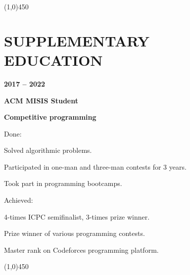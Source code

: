\documentclass[a4paper,12pt,preview]{report}
\newcommand{\hr}{\begin{center} \line(1,0){450} \end{center}}
\begin{document}
\hr


\section*{SUPPLEMENTARY EDUCATION}

\begin{minipage}[c]{0.25\linewidth}
    \textbf{2017 – 2022} 
\end{minipage}
\begin{minipage}[c]{0.65\linewidth}
    \textbf{ACM MISIS Student}
    
    \textbf{Competitive programming}
\end{minipage}

\vspace{5mm} %

\begin{minipage}[c]{0.15\linewidth}
    Done:
\end{minipage}
\begin{minipage}[c]{0.75\linewidth}
	Solved algorithmic problems.
	
	Participated in one-man and three-man contests for 3 years.
	
	Took part in programming bootcamps.
\end{minipage}

\vspace{5mm} %

\begin{minipage}[c]{0.15\linewidth}
    Achieved:
\end{minipage}
\begin{minipage}[c]{0.75\linewidth}
	4-times ICPC semifinalist, 3-times prize winner.
	
	Prize winner of various programming contests.
	
	Master rank on Codeforces programming platform.
\end{minipage}

\hr 
\end{document}
